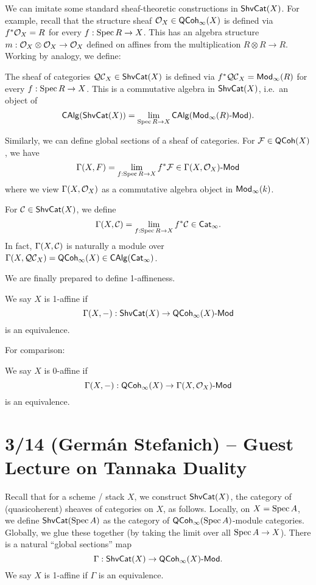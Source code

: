 \documentclass{article}
\begin{document}
We can imitate some standard sheaf-theoretic constructions in $\mathsf{ShvCat}(X)$.
For example, recall that the structure sheaf $\mathcal{O}_X \in \mathsf{QCoh}_\infty(X)$ is defined via $f^* \mathcal{O}_X = R$ for every $f: \operatorname{Spec} R \to X$.
This has an algebra structure $m: \mathcal{O}_X \otimes \mathcal{O}_X \to \mathcal{O}_X$ defined on affines from the multiplication $R \otimes R \to R$.
Working by analogy, we define:

\begin{dfn}
	The sheaf of categories $\mathcal{QC}_X \in \mathsf{ShvCat}(X)$ is defined via $f^* \mathcal{QC}_X = \mathsf{Mod}_\infty(R)$ for every $f: \operatorname{Spec} R \to X$.
	This is a commutative algebra in $\mathsf{ShvCat}(X)$, i.e.\ an object of
	\[
		\mathsf{CAlg}(\mathsf{ShvCat}(X)) = \lim_{\operatorname{Spec} R \to X} \mathsf{CAlg}(\mathsf{Mod}_\infty(R)\text{-}\mathsf{Mod}).
	\]
\end{dfn}

Similarly, we can define global sections of a sheaf of categories.
For $\mathcal{F} \in \mathsf{QCoh}(X)$, we have 
\[
	\Gamma(X, F) = \lim_{f: \operatorname{Spec} R \to X} f^* \mathcal{F} \in \Gamma(X, \mathcal{O}_X)\text{-}\mathsf{Mod}
\]
where we view $\Gamma(X, \mathcal{O}_X)$ as a commutative algebra object in $\mathsf{Mod}_\infty(k)$.

\begin{dfn}
	For $\mathcal{C} \in \mathsf{ShvCat}(X)$, we define
	\[
		\Gamma(X, \mathcal{C}) = \lim_{f: \operatorname{Spec} R \to X} f^* \mathcal{C} \in \mathsf{Cat}_\infty.
	\]
	In fact, $\Gamma(X, \mathcal{C})$ is naturally a module over $\Gamma(X, \mathcal{QC}_X) = \mathsf{QCoh}_\infty(X) \in \mathsf{CAlg}(\mathsf{Cat}_\infty)$.
\end{dfn}

We are finally prepared to define 1-affineness.

\begin{dfn}
	We say $X$ is 1-affine if
	\[
		\Gamma(X, -): \mathsf{ShvCat}(X) \to \mathsf{QCoh}_\infty(X)\text{-}\mathsf{Mod}
	\]
	is an equivalence.
\end{dfn}

For comparison:

\begin{dfn}
	We say $X$ is 0-affine if
	\[
		\Gamma(X, -): \mathsf{QCoh}_\infty(X) \to \Gamma(X, \mathcal{O}_X)\text{-}\mathsf{Mod}
	\]
	is an equivalence.
\end{dfn}

\section{3/14 (Germ\'an Stefanich) -- Guest Lecture on Tannaka Duality}

Recall that for a scheme / stack $X$, we construct $\mathsf{ShvCat}(X)$, the category of (quasicoherent) sheaves of categories on $X$, as follows.
Locally, on $X = \operatorname{Spec} A$, we define $\mathsf{ShvCat}(\operatorname{Spec} A)$ as the category of $\mathsf{QCoh}_\infty(\operatorname{Spec} A)$-module categories.
Globally, we glue these together (by taking the limit over all $\operatorname{Spec} A \to X$).
There is a natural ``global sections'' map
\[
	\Gamma: \mathsf{ShvCat}(X) \to \mathsf{QCoh}_\infty(X)\text{-}\mathsf{Mod}.
\]
We say $X$ is 1-affine if $\Gamma$ is an equivalence.
\end{document}
